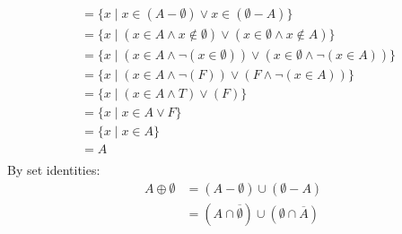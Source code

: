 \documentclass[12pt letter]{report}
\begin{document}
{\begin{enumerate}
\begin{align*}
                               & = \{x  \mid x \in \left( A - \emptyset \right) \vee  x \in \left( \emptyset - A \right)  \} \tag*{Definition of
            Union}                                                                                                                                  \\
                               & = \{x  \mid \left( x \in A \wedge  x \notin \emptyset \right)\vee  \left( x \in \emptyset \wedge x \notin A
            \right)   \} \tag*{Definition of Difference}                                                                                            \\
                               & = \{x  \mid \left( x \in A \wedge  \neg \left( x \in \emptyset \right)  \right) \vee  \left( x
            \in \emptyset \wedge
            \neg  \left( x \in A \right) \right)  \} \tag*{Definition of Complement}                                                                \\
                               & = \{x  \mid \left( x \in A \wedge  \neg \left( F \right)  \right) \vee \left( F \wedge \neg \left( x
            \in A\right)   \right)   \} \tag*{Definition of $\in $}                                                                                 \\
                               & = \{x  \mid \left( x \in A \wedge T \right) \vee \left( F \right)  \} \tag*{By Second Domination Law
            for propositional logic}                                                                                                                \\
                               & = \{x \mid x \in A \vee F\} \tag*{By First Identity Law for propositional logic}                                   \\
                               & = \{x  \mid x \in A\} \tag*{By Second Identity Law for propositional logic}                                        \\
                               & = A \tag*{Definition of set $A$}                                                                                   \\
          \end{align*}
          By set identities:
          \begin{align*}
            A \oplus \emptyset & = \left( A - \emptyset \right)  \cup \left( \emptyset - A \right)  \tag*{Definition of Symmetric Difference}     \\
                               & = \left( A \cap \overline{\emptyset} \right) \cup \left( \emptyset \cap \overline{A} \right) \tag*{Definition of
}
\end{align*}
\end{enumerate}}
\end{document}
